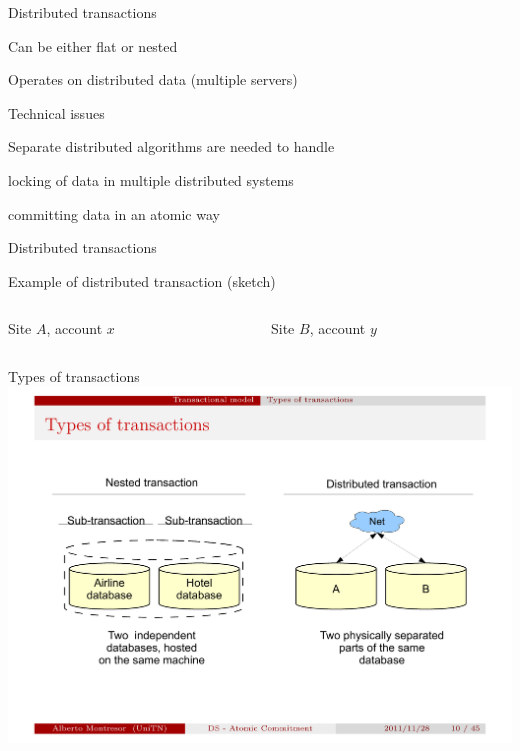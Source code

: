 \begin{frame}{Distributed transactions}

\BI
  \item Can be either flat or nested
  \item Operates on distributed data (multiple servers)
  \item Technical issues
  \BI
    \item Separate distributed algorithms are needed to handle
	\BI
	  \item locking of data in multiple distributed systems
	  \item committing data in an atomic way
	\EI
  \EI
\EI
\end{frame}

\begin{frame}{Distributed transactions}
	
Example of distributed transaction (sketch)
\bigskip
\begin{columns}
\begin{column}{0.5\textwidth}
\begin{Procedure}
\caption{Site $A$, account $x$}
\vspace{1.10cm}
\end{Procedure}
\end{column}
\begin{column}{0.5\textwidth}
\begin{Procedure}
\caption{Site $B$, account $y$}
\end{Procedure}
\end{column}
\end{columns}

\end{frame}

\begin{frame}{Types of transactions}
\includegraphics[width=\textwidth]{fig1-nested-distributed.pdf}
\end{frame}

